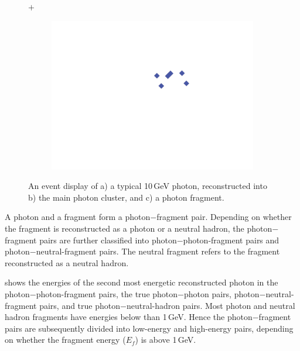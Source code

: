 \begin{figure}[tbph]
\begin{subfigure}[c]{0.3\textwidth}
    \caption{}
    \label{fig:photonEvtDspPhotonFragBig}
  \end{subfigure}
   {\LARGE$+$}%
  \begin{subfigure}[c]{0.3\textwidth}
    \includegraphics[width=\textwidth]{photon/small2}
    \caption{}
    \label{fig:photonEvtDspPhotonFragSmall}
  \end{subfigure}
\caption
{An event display of a) a typical 10\,GeV photon, reconstructed into  b) the main photon cluster,  and c) a photon fragment. }
\label{fig:photonEvtDspPhotonFrag}
\end{figure}




A photon and a fragment form a photon$-$fragment pair.  Depending on whether the fragment is reconstructed as a photon or a neutral hadron, the photon$-$fragment pairs are further classified into photon$-$photon-fragment pairs and photon$-$neutral-fragment pairs. The neutral fragment refers to the fragment reconstructed as a neutral hadron. 

 shows the energies of the second most energetic reconstructed photon in the photon$-$photon-fragment pairs, the true photon$-$photon pairs, photon$-$neutral-fragment pairs, and true photon$-$neutral-hadron pairs. Most photon and neutral hadron fragments have energies below than 1\,GeV. Hence the photon$-$fragment pairs are subsequently  divided into low-energy and high-energy pairs, depending on whether the fragment energy ($E_f$) is above 1\,GeV. 

